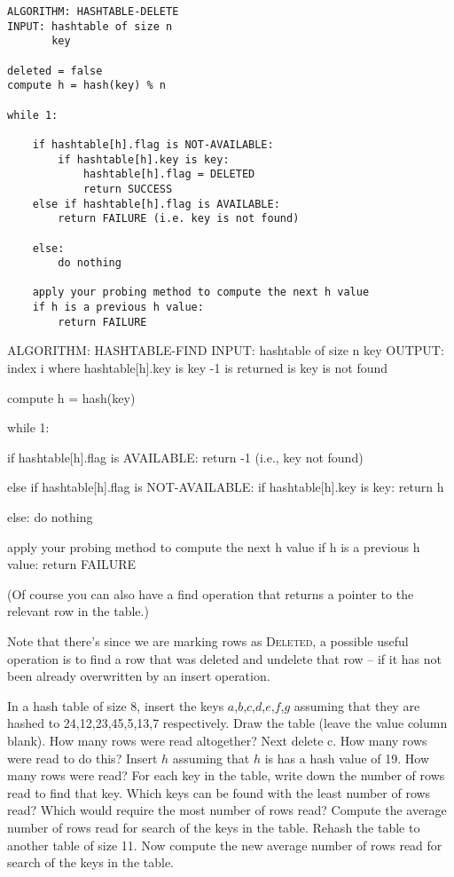\begin{Verbatim}[frame=single]
ALGORITHM: HASHTABLE-DELETE
INPUT: hashtable of size n
       key

deleted = false
compute h = hash(key) % n

while 1:
    
    if hashtable[h].flag is NOT-AVAILABLE:
        if hashtable[h].key is key:
            hashtable[h].flag = DELETED
            return SUCCESS
    else if hashtable[h].flag is AVAILABLE:
        return FAILURE (i.e. key is not found)

    else:
        do nothing

    apply your probing method to compute the next h value
    if h is a previous h value:
        return FAILURE
\end{Verbatim}


\begin{console}
ALGORITHM: HASHTABLE-FIND
INPUT: hashtable of size n
       key
OUTPUT: index i where hashtable[h].key is key
            -1 is returned is key is not found

compute h = hash(key) %

while 1:

    if hashtable[h].flag is AVAILABLE:
        return -1 (i.e., key not found)

    else if hashtable[h].flag is NOT-AVAILABLE:
        if hashtable[h].key is key:
            return h
            
    else:
        do nothing
        
    apply your probing method to compute the next h value
    if h is a previous h value:
        return FAILURE
\end{console}
(Of course you can also have a find operation that returns a pointer
to the relevant row in the table.)

Note that there's since we are marking rows as \textsc{Deleted},
a possible useful operation is to find a row that was deleted
and undelete that row -- if it has not been already overwritten
by an insert operation.

\begin{ex}
  In a hash table of size 8, insert the keys
  $a$,$b$,$c$,$d$,$e$,$f$,$g$
  assuming that they are hashed to
  24,12,23,45,5,13,7 respectively.
  Draw the table (leave the value column blank).
  How many rows were read altogether?
  Next delete c. How many rows were read to do this?
  Insert $h$ assuming that $h$ is has a hash value of 19.
  How many rows were
  read?
  For each key in the table,
  write down the number of rows read to find
  that key.
  Which keys can be found with the least number of
  rows read?
  Which would require the most number of rows read?
  Compute the average number of rows read for search of the keys in the table.
  Rehash the table to another table of size 11.
  Now compute the new
  average number of rows read for search of the keys in the table.
\end{ex}

